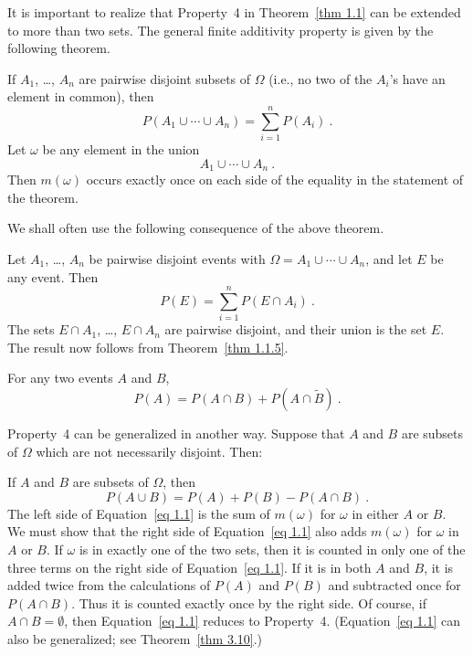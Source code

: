 \par
It is important to realize that Property~4 in Theorem~\ref{thm 1.1} 
can be extended to more than two sets.  The general finite additivity
property is given by the following
theorem.\hfil\break
\begin{theorem}\label{thm 1.1.5}
If $A_1$, \dots, $A_n$ are pairwise disjoint subsets of $\Omega$
(i.e., no two of the $A_i$'s have an element in common), then
$$
P(A_1 \cup \cdots \cup A_n) = \sum_{i = 1}^n P(A_i)\ .
$$
\proof
Let $\omega$ be any element in the union
$$A_1 \cup \cdots \cup A_n\ .$$
Then $m(\omega)$ occurs exactly once on each side of the equality in the
statement of the theorem.
\end{theorem} 
\par
We shall often use the following consequence of the above theorem.
\begin{theorem}\label{thm 1.2}
 Let $A_1$, \dots, $A_n$ be pairwise disjoint events with $\Omega = A_1
\cup \cdots \cup A_n$, and let $E$ be any event.  Then
$$
P(E) = \sum_{i = 1}^n P(E \cap A_i)\ .
$$
\proof
The sets $E \cap A_1$, \dots, $E \cap A_n$ are pairwise disjoint, and their 
union is the set $E$.  The result now follows from Theorem~\ref{thm 1.1.5}.
\end{theorem}
\begin{corollary}\label{cor 1.1}
For any two events $A$ and $B$,
$$
P(A) = P(A \cap B) + P(A \cap \tilde B)\ .
$$
\end{corollary}
\par
Property~4 can be generalized in another way.  Suppose that $A$ and $B$ are
subsets of $\Omega$ which are not necessarily disjoint.  Then:\hfil\break
\begin{theorem}\label{thm 1.2.5}
If $A$ and $B$ are subsets of $\Omega$, then
\begin{equation}
P(A \cup B) = P(A) + P(B) - P(A \cap B)\ .
\label{eq 1.1}
\end{equation}                                                        
\proof
The left side of Equation~\ref{eq 1.1} is the sum of $m(\omega)$ for     
$\omega$ in either $A$ or $B$.  We must show that the right side of 
Equation~\ref{eq 1.1} also adds $m(\omega)$ for $\omega$ in $A$ or $B$. 
If $\omega$ is in exactly one of the two sets, then it is counted in only one
of the three terms on the right side of Equation~\ref{eq 1.1}.                
If it is in both $A$ and $B$, it is added twice from the calculations of
$P(A)$ and $P(B)$
and subtracted once for $P(A \cap B)$.  Thus it is counted exactly once by
the right side.  Of course, if $A \cap B = \emptyset$, then Equation~\ref{eq 1.1} 
reduces to Property~4.
(Equation~\ref{eq 1.1} can also be generalized; see Theorem~\ref{thm 3.10}.)               
\end{theorem}


